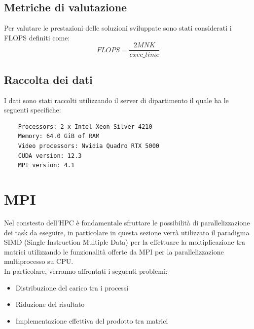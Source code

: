 \documentclass[conference]{IEEEtran}
\begin{document}
\subsection{Metriche di valutazione}
Per valutare le prestazioni delle soluzioni sviluppate sono stati considerati i FLOPS definiti come:
\begin{equation}
    FLOPS = \frac{2MNK}{exec\_time}
\end{equation}
\subsection{Raccolta dei dati}
I dati sono stati raccolti utilizzando il server di dipartimento il quale ha le seguenti specifiche:
\begin{verbatim}
    Processors: 2 x Intel Xeon Silver 4210
    Memory: 64.0 GiB of RAM
    Video processors: Nvidia Quadro RTX 5000
    CUDA version: 12.3
    MPI version: 4.1
\end{verbatim}
\section{MPI}
Nel constesto dell'HPC è fondamentale sfruttare le possibilità di parallelizzazione dei task da eseguire, in particolare in questa sezione verrà utilizzato il paradigma SIMD (Single Instruction Multiple Data) per la effettuare la moltiplicazione tra matrici utilizzando le funzionalità offerte da MPI per la parallelizzazione multiprocesso su CPU.\\ In particolare, verranno affrontati i seguenti problemi:
\begin{itemize}
    \item Distribuzione del carico tra i processi
    \item Riduzione del risultato
    \item Implementazione effettiva del prodotto tra matrici
\end{itemize}
\end{document}
